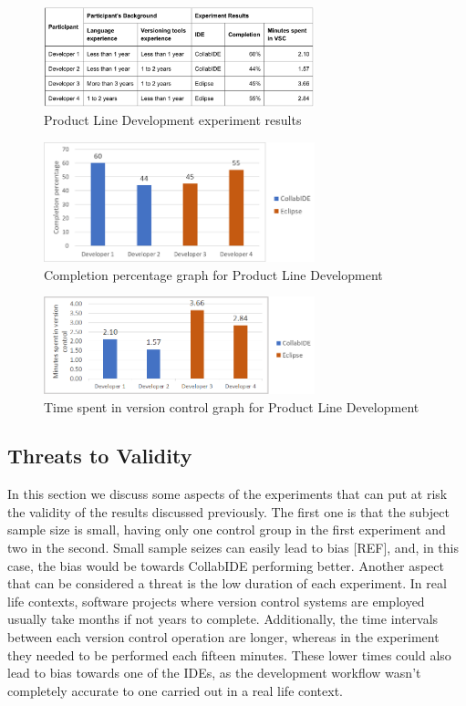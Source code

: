 \begin{figure}[htbp]
  \centering
  \includegraphics[width=0.7\textwidth]{img/resultsTableProductLine}
  \caption{Product Line Development experiment results}
  \label{fig:collabide}
\end{figure}

\begin{figure}[htbp]
  \centering
  \includegraphics[width=0.7\textwidth]{img/completionProductLine}
  \caption{Completion percentage graph for Product Line Development}
  \label{fig:collabide}
\end{figure}

\begin{figure}[htbp]
  \centering
  \includegraphics[width=0.7\textwidth]{img/versionControlProductLine}
  \caption{Time spent in version control graph for Product Line Development}
  \label{fig:collabide}
\end{figure}

\subsection{Threats to Validity}
In this section we discuss some aspects of the experiments that can put at risk the validity of the results discussed previously. The first one is that the subject sample size is small, having only one control group in the first experiment and two in the second. Small sample seizes can easily lead to bias [REF], and, in this case, the bias would be towards CollabIDE performing better. Another aspect that can be considered a threat is the low duration of each experiment. In real life contexts, software projects where version control systems are employed usually take months if not years to complete. Additionally, the time intervals between each version control operation are longer, whereas in the experiment they needed to be performed each fifteen minutes. These lower times could also lead to bias towards one of the IDEs, as the development workflow wasn’t completely accurate to one carried out in a real life context. 


\endinput